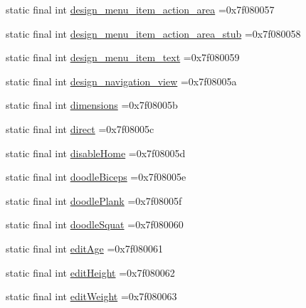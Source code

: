 \begin{DoxyCompactItemize}
\item 
static final int \mbox{\hyperlink{classcom_1_1example_1_1trainawearapplication_1_1_r_1_1id_a13fd2c90238aa64097642d117929c8f2}{design\+\_\+menu\+\_\+item\+\_\+action\+\_\+area}} =0x7f080057
\item 
static final int \mbox{\hyperlink{classcom_1_1example_1_1trainawearapplication_1_1_r_1_1id_a85b460dc96cd8a714b4b55abd1b51080}{design\+\_\+menu\+\_\+item\+\_\+action\+\_\+area\+\_\+stub}} =0x7f080058
\item 
static final int \mbox{\hyperlink{classcom_1_1example_1_1trainawearapplication_1_1_r_1_1id_a235a8568ea2092f7a633fb673d03cd6c}{design\+\_\+menu\+\_\+item\+\_\+text}} =0x7f080059
\item 
static final int \mbox{\hyperlink{classcom_1_1example_1_1trainawearapplication_1_1_r_1_1id_a6ab4f32d2e8ce1d1a6d49050af9c84f7}{design\+\_\+navigation\+\_\+view}} =0x7f08005a
\item 
static final int \mbox{\hyperlink{classcom_1_1example_1_1trainawearapplication_1_1_r_1_1id_ad7ccf92ceb5d14bd43686a8fece4d49d}{dimensions}} =0x7f08005b
\item 
static final int \mbox{\hyperlink{classcom_1_1example_1_1trainawearapplication_1_1_r_1_1id_ad0b53bf870b862dd1eec521f6e6b06a6}{direct}} =0x7f08005c
\item 
static final int \mbox{\hyperlink{classcom_1_1example_1_1trainawearapplication_1_1_r_1_1id_aa2015992ac9731a2ee0e6900a421cd45}{disable\+Home}} =0x7f08005d
\item 
static final int \mbox{\hyperlink{classcom_1_1example_1_1trainawearapplication_1_1_r_1_1id_a83866166d06d3b6beaa71c4e495a5bd7}{doodle\+Biceps}} =0x7f08005e
\item 
static final int \mbox{\hyperlink{classcom_1_1example_1_1trainawearapplication_1_1_r_1_1id_a74adbe26c1bd2bb4c1a167d5ca75319d}{doodle\+Plank}} =0x7f08005f
\item 
static final int \mbox{\hyperlink{classcom_1_1example_1_1trainawearapplication_1_1_r_1_1id_a3996c72ccb2da809a19548e85572973b}{doodle\+Squat}} =0x7f080060
\item 
static final int \mbox{\hyperlink{classcom_1_1example_1_1trainawearapplication_1_1_r_1_1id_afaf722de0113a8bde48f88a04244d75f}{edit\+Age}} =0x7f080061
\item 
static final int \mbox{\hyperlink{classcom_1_1example_1_1trainawearapplication_1_1_r_1_1id_a29c926b2832847c7c17ee3328f008d5c}{edit\+Height}} =0x7f080062
\item 
static final int \mbox{\hyperlink{classcom_1_1example_1_1trainawearapplication_1_1_r_1_1id_a79e16482edd59b00f8feacae8e0051fe}{edit\+Weight}} =0x7f080063

\end{DoxyCompactItemize}
